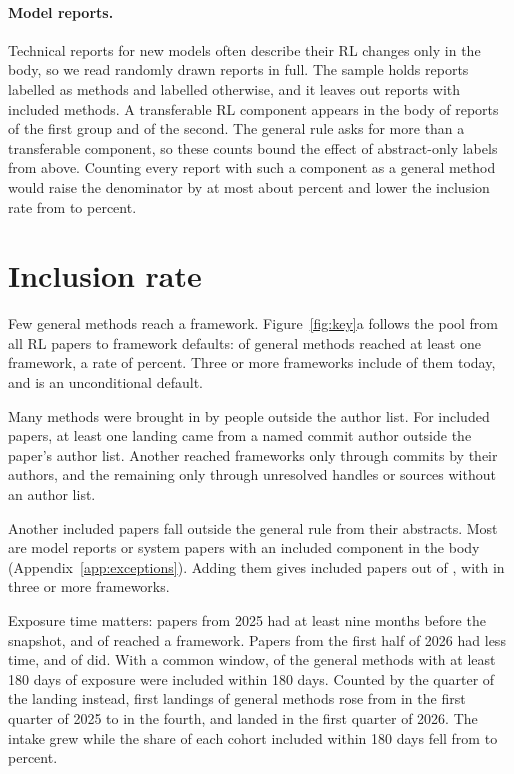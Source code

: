\documentclass{article}
\begin{document}
\paragraph{Model reports.} Technical reports for new models often describe their RL changes only in the body, so we read \NReportsRead{} randomly drawn reports in full. The sample holds \NReportsMethod{} reports labelled as methods and \NReportsOther{} labelled otherwise, and it leaves out reports with included methods. A transferable RL component appears in the body of \NReportsMethodGen{} reports of the first group and \NReportsOtherGen{} of the second. The general rule asks for more than a transferable component, so these counts bound the effect of abstract-only labels from above. Counting every report with such a component as a general method would raise the denominator by at most about \NReportAdjWidePct{} percent and lower the inclusion rate from \RateMain{} to \RateWide{} percent.

\section{Inclusion rate}
\label{sec:how-much}

Few general methods reach a framework. Figure~\ref{fig:key}a follows the pool from all RL papers to framework defaults: \NAdopted{} of \NGeneral{} general methods reached at least one framework, a rate of \RateMain{} percent. Three or more frameworks include \NThree{} of them today, and \NDefault{} is an unconditional default.

Many methods were brought in by people outside the author list. For \NIndependent{} included papers, at least one landing came from a named commit author outside the paper's author list. Another \NAuthorOnly{} reached frameworks only through commits by their authors, and the remaining \NOnlyUnknown{} only through unresolved handles or sources without an author list.

Another \NExceptions{} included papers fall outside the general rule from their abstracts. Most are model reports or system papers with an included component in the body (Appendix~\ref{app:exceptions}). Adding them gives \NAdoptedPlus{} included papers out of \NGeneralPlus{}, with \NThreePlus{} in three or more frameworks.

Exposure time matters: papers from 2025 had at least nine months before the snapshot, and \NEarlyAdopted{} of \NEarly{} reached a framework. Papers from the first half of 2026 had less time, and \NLateAdopted{} of \NLate{} did. With a common window, \NFollowIncluded{} of the \NFollowEligible{} general methods with at least 180 days of exposure were included within 180 days. Counted by the quarter of the landing instead, first landings of general methods rose from \LandFirst{} in the first quarter of 2025 to \LandPeak{} in the fourth, and \LandLast{} landed in the first quarter of 2026. The intake grew while the share of each cohort included within 180 days fell from \QRateFirst{} to \QRateLast{} percent.
\end{document}
